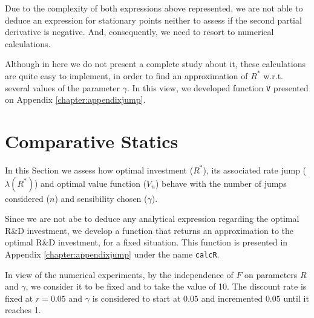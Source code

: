 Due to the complexity of both expressions above represented, we are not able to deduce an expression for stationary points neither to assess if the second partial derivative is negative. And, consequently, we need to resort to numerical calculations.


Although in here we do not present a complete study about it, these calculations are quite easy to implement, in order to find an approximation of $R^*$ w.r.t. several values of the parameter $\gamma$. In this view, we developed function \texttt{V} presented on Appendix \ref{chapter:appendixjump}.














\section{Comparative Statics}
\label{maximexp_cs}

In this Section we assess how optimal investment ($R^*$), its associated rate jump ($\lambda(R^*)$) and optimal value function ($V_n$) behave with the number of jumps considered ($n$) and sensibility chosen ($\gamma$).


Since we are not abe to deduce any analytical expression regarding the optimal R\&D investment, we develop a function that returns an approximation to the optimal R\&D investment, for a fixed situation. This function is presented in Appendix \ref{chapter:appendixjump} under the name \texttt{calcR}.

In view of the numerical experiments, by the independence of $F$ on parameters $R$ and $\gamma$, we consider it to be fixed and to take the value of 10. The discount rate is fixed at $r=0.05$ and $\gamma$ is considered to start at $0.05$ and incremented $0.05$ until it reaches 1.


